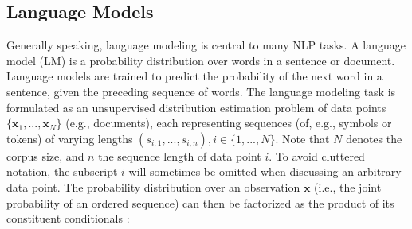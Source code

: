 
\subsection{Language Models}

Generally speaking, language modeling is central to many NLP tasks. A language model (LM) is a probability distribution over words in a sentence or document. Language models are trained to predict the probability of the next word in a sentence, given the preceding sequence of words. The language modeling task is formulated as an unsupervised distribution estimation problem of data points $\{\textbf{x}_1, ..., \textbf{x}_N\}$ (e.g., documents), each representing sequences (of, e.g., symbols or tokens) of varying lengths $(s_{i, 1}, ..., s_{i, n}), i \in \{1, ..., N\}$. Note that $N$ denotes the corpus size, and $n$ the sequence length of data point $i$. To avoid cluttered notation, the subscript $i$ will sometimes be omitted when discussing an arbitrary data point. The probability distribution over an observation $\textbf{x}$  (i.e., the joint probability of an ordered sequence) can then be factorized as the product of its constituent conditionals \citep{radford2019language}:

